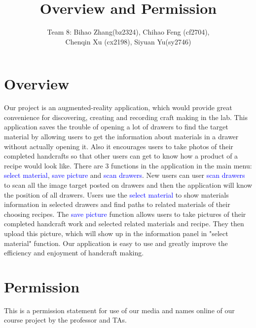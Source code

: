 \documentclass[10pt]{article}
\title{Overview and Permission}
\author{Team 8: Bihao Zhang(bz2324), Chihao Feng (cf2704), \\Chenqin Xu (cx2198), Siyuan Yu(sy2746)}
\begin{document}
\maketitle
\section{Overview}
Our project is an augmented-reality application, which would provide great convenience for discovering, creating and recording craft making in the lab. This application saves the trouble of opening a lot of drawers to find the target material by allowing users to get the information about materials in a drawer without actually opening it. Also it encourages users to take photos of their completed handcrafts so that other users can get to know how a product of a recipe would look like. There are 3 functions in the application in the main menu: \textcolor{blue}{select material}, \textcolor{blue}{save picture} and \textcolor{blue}{scan drawers}. New users can user \textcolor{blue}{scan drawers} to scan all the image target posted on drawers and then the application will know the position of all drawers. Users use the \textcolor{blue}{select material} to show materials information in selected drawers and find paths to related materials of their choosing recipes. The \textcolor{blue}{save picture} function allows users to take pictures of their completed handcraft work and selected related materials and recipe. They then upload this picture, which will show up in the information panel in "select material" function. Our application is easy to use and greatly improve the efficiency and enjoyment of handcraft making.


\section{Permission}
This is a permission statement for use of our media and names online of our course project by the professor and TAs.
\end{document}

